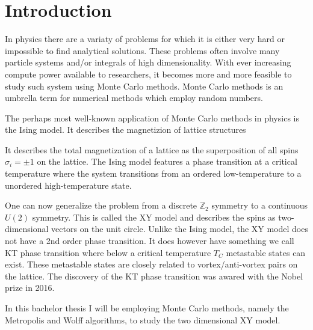 \chapter{Introduction}\label{chap:introduction}
	In physics there are a variaty of problems for which it is either very hard or impossible to find analytical solutions. These problems often involve many particle systems and/or integrals of high dimensionality. With ever increasing compute power available to researchers, it becomes more and more feasible to study such system using Monte Carlo methods. Monte Carlo methods is an umbrella term for numerical methods which employ random numbers.
	
	The perhaps most well-known application of Monte Carlo methods in physics is the Ising model. It describes the magnetizion of lattice structures
	
	  It describes the total magnetization of a lattice as the superposition of all spins $\sigma_i = \pm 1$ on the lattice. The Ising model features a phase transition at a critical temperature where the system transitions from an ordered low-temperature to a unordered high-temperature state.
	
	One can now generalize the problem from a discrete $\mathbb{Z}_2$ symmetry to a continuous $U(2)$ symmetry. This is called the XY model and describes the spins as two-dimensional vectors on the unit circle. Unlike the Ising model, the XY model does not have a 2nd order phase transition. It does however have something we call KT phase transition where below a critical temperature $T_C$ metastable states can exist. These metastable states are closely related to vortex/anti-vortex pairs on the lattice. The discovery of the KT phase transition was awared with the Nobel prize in 2016.
	
	In this bachelor thesis I will be employing Monte Carlo methods, namely the Metropolis and Wolff algorithms, to study the two dimensional XY model. 